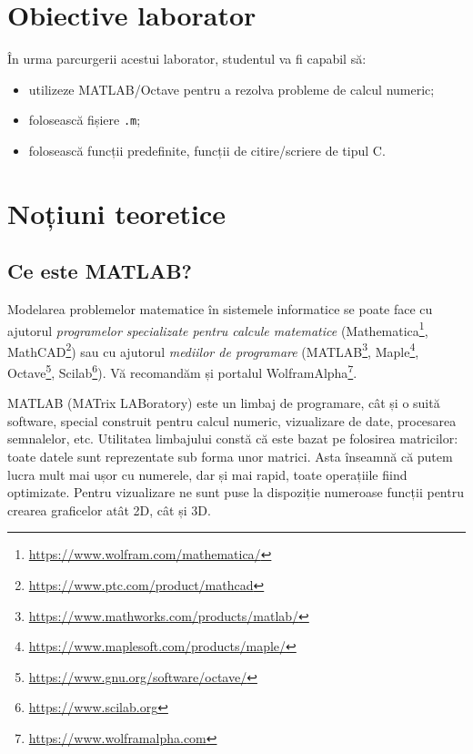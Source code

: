 \documentclass{exam}
\title{
\textmd{\textbf{\MNLabTitle}}
\author{}
\date{}
}
\begin{document}
\begin{coverpages}
	\maketitle
	\thispagestyle{empty}
	\tableofcontents
\end{coverpages}

\section{Obiective laborator}

În urma parcurgerii acestui laborator, studentul va fi capabil să:
\begin{itemize}
	\item utilizeze MATLAB/Octave pentru a rezolva probleme de calcul numeric;
	\item folosească fișiere \verb|.m|;
	\item folosească funcții predefinite, funcții de citire/scriere de tipul C.
\end{itemize}

\section{Noțiuni teoretice}

\subsection{Ce este MATLAB?}

\par Modelarea problemelor matematice în sistemele informatice se poate face cu
ajutorul \textit{programelor specializate pentru calcule matematice}
(Mathematica\footnote{\url{https://www.wolfram.com/mathematica/}},
MathCAD\footnote{\url{https://www.ptc.com/product/mathcad}}) sau cu ajutorul
\textit{mediilor de programare} (MATLAB\footnote{\url{https://www.mathworks.com/products/matlab/}},
Maple\footnote{\url{https://www.maplesoft.com/products/maple/}},
Octave\footnote{\url{https://www.gnu.org/software/octave/}},
Scilab\footnote{\url{https://www.scilab.org}}).
Vă recomandăm și portalul WolframAlpha\footnote{\url{https://www.wolframalpha.com}}.

\par MATLAB (MATrix LABoratory) este un limbaj de programare, cât și o suită
software, special construit pentru calcul numeric, vizualizare de date,
procesarea semnalelor, etc.
Utilitatea limbajului constă că este bazat pe folosirea matricilor: toate datele sunt reprezentate sub forma unor matrici. Asta înseamnă că putem lucra mult mai ușor cu numerele, dar și mai rapid, toate operațiile fiind optimizate.
Pentru vizualizare ne sunt puse la dispoziție numeroase funcții pentru crearea graficelor atât 2D, cât și 3D.
\end{document}
